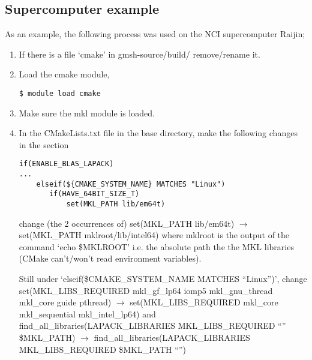 \documentclass[11pt,a4paper,twoside]{report}
\begin{document}
\subsection{Supercomputer example}

As an example, the following process was used on the NCI supercomputer Raijin;
\begin{enumerate}
\item If there is a file `cmake' in gmsh-source/build/ remove/rename it.
\item Load the cmake module,
\begin{lstlisting}
$ module load cmake
\end{lstlisting}
\item Make sure the mkl module is loaded.

\item In the CMakeLists.txt file in the base directory, make the following changes in the section

\begin{lstlisting}
if(ENABLE_BLAS_LAPACK)
...
    elseif(${CMAKE_SYSTEM_NAME} MATCHES "Linux")
       if(HAVE_64BIT_SIZE_T)
           set(MKL_PATH lib/em64t)
\end{lstlisting}

change (the 2 occurrences of) 
\newline
\newline
set(MKL\_PATH lib/em64t) $\to$ set(MKL\_PATH mklroot/lib/intel64)
\newline
\newline
where mklroot is the output of the command `echo \$MKLROOT' i.e. the absolute path the the MKL libraries (CMake can't/won't read environment variables). 
\newline

Still under `elseif(\${CMAKE\_SYSTEM\_NAME} MATCHES ``Linux'')', change
\newline
\newline
set(MKL\_LIBS\_REQUIRED mkl\_gf\_lp64 iomp5 mkl\_gnu\_thread mkl\_core guide pthread)\newline
$\to$ set(MKL\_LIBS\_REQUIRED mkl\_core mkl\_sequential mkl\_intel\_lp64)
\newline
\newline
and
\newline
\newline
find\_all\_libraries(LAPACK\_LIBRARIES MKL\_LIBS\_REQUIRED ``'' \${MKL\_PATH}) $\to$
find\_all\_libraries(LAPACK\_LIBRARIES MKL\_LIBS\_REQUIRED \${MKL\_PATH} ``'')



\end{enumerate}
\end{document}
